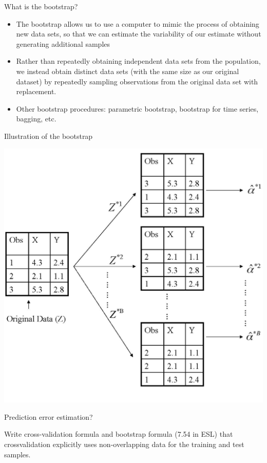 \documentclass[14pt]{beamer}
\begin{document}
\begin{frame}[plain]{What is the bootstrap?}

\begin{itemize}
	\item  The bootstrap allows us to use a computer to mimic the process of obtaining new data sets, so that we can estimate the variability of our estimate without generating additional samples
	\item Rather than repeatedly obtaining independent data sets
from the population, we instead obtain distinct data sets (with the same size as our original dataset) by repeatedly sampling observations from the original data set with replacement.
	\item Other bootstrap procedures: parametric bootstrap, bootstrap for time series, bagging, etc.
\end{itemize}
\end{frame}

\begin{frame}[plain]{Illustration of the bootstrap}

\begin{center}
\includegraphics[width=.7\textwidth]{5-11.png}	
\end{center}
\end{frame}

\begin{frame}[plain]{Prediction error estimation?}

Write cross-validation formula and bootstrap formula (7.54 in ESL)
that crossvalidation
explicitly uses non-overlapping data for the training and test
samples.

\end{frame}
\end{document}
